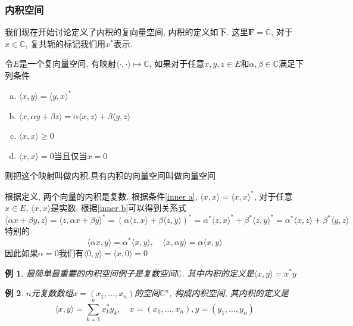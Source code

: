 \documentclass[a4paper,11pt]{article}
\theoremstyle{mystyle}
\newtheorem{example}{\hspace{2em}例}[section]
\begin{document}
\subsubsection*{内积空间}
我们现在开始讨论定义了内积的复向量空间, 内积的定义如下. 这里$\mathbf{F}=\mathbb{C}$, 对于$x\in\mathbb{C}$, 复共轭的标记我们用$x^*$表示.
\begin{definition}\label{inner def}
  令$E$是一个复向量空间, 有映射$\langle\cdot,\cdot\rangle\mapsto\mathbb{C}$, 如果对于任意$x,y,z\in E$和$\alpha,\beta\in \mathbb{C}$满足下列条件
  \begin{enumerate}[(a)]
    \item\label{inner a} $\langle x,y\rangle=\langle y,x\rangle^*$
    \item\label{inner b} $\langle x,\alpha y+\beta z\rangle=\alpha\langle x,z\rangle+\beta\langle y,z\rangle$
    \item $\langle x,x\rangle\geq 0$
    \item $\langle x,x\rangle=0$当且仅当$x=0$
  \end{enumerate}
  则把这个映射叫做内积.具有内积的向量空间叫做向量空间
\end{definition}
根据定义, 两个向量的内积是复数. 根据条件\ref{inner a}, $\langle x,x\rangle=\langle x,x\rangle^*$, 对于任意$x\in E$, $\langle x,x\rangle$是实数. 根据\ref{inner b}可以得到关系式
\begin{equation*}
  \langle\alpha x+\beta y,z\rangle=\langle z,\alpha x+\beta y\rangle^*=(\alpha\langle z,x\rangle+\beta\langle z,y\rangle)^*=\alpha^*\langle z,x\rangle^*+\beta^*\langle z,y\rangle^*=\alpha^*\langle x,z\rangle+\beta^*\langle y,z\rangle
\end{equation*}
特别的
\begin{equation*}
  \langle\alpha x,y\rangle=\alpha^*\langle x,y\rangle,\quad \langle x,\alpha y\rangle=\alpha\langle x,y\rangle
\end{equation*}
因此如果$\alpha=0$我们有$\langle 0,y\rangle=\langle x,0\rangle=0$
\begin{example}
  最简单最重要的内积空间例子是复数空间$\mathbb{C}$. 其中内积的定义是$\langle x,y\rangle=x^*y$
\end{example}
\begin{example}
  $n$元复数数组$x=(x_1,\dots,x_n)$的空间$\mathbb{C}^n$, 构成内积空间, 其内积的定义是
  \begin{equation*}
    \langle x,y\rangle=\sum_{k=1}^{n}x_k^* y_k,\quad x=(x_1,\dots,x_n),y=(y_1,\dots,y_n)
  \end{equation*}
\end{example}
\end{document}
